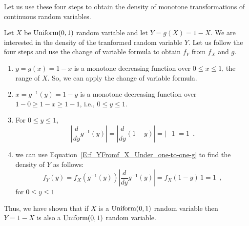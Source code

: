 Let us use these four steps to obtain the density of monotone transformations of continuous random variables.

\begin{example}
Let $X$ be $\mbox{{\rm Uniform}}(0,1)$ random variable and let $Y=g(X)=1-X$.  
We are interested in the density of the tranformed random variable $Y$. Let us follow the four steps and use the change of variable formula to obtain $f_Y$ from $f_X$ and $g$.
\begin{enumerate}
\item $y=g(x)=1-x$ is a monotone decreasing function over $0 \leq x \leq 1$, the range of $X$.  
So, we can apply the change of variable formula. 
\item $x=g^{-1}(y)=1-y$ is a monotone decreasing function over $1-0 \geq 1-x \geq 1-1$, i.e., $0 \leq y \leq 1$.  
\item For $0 \leq y \leq 1$,
\[
 \left\vert \frac{d}{dy} g^{-1}(y) \right\vert 
= \left\vert \frac{d}{dy} \left( 1-y \right) \right\vert 
= \left\vert -1 \right\vert = 1 \enspace .
\]
\item we can use Equation~\eqref{E:f_YFromf_X_Under_one-to-one-g} to find the density of $Y$ as follows:
\[
f_Y(y) = f_X \left( g^{-1}(y) \right) \left\vert \frac{d}{dy} g^{-1}(y) \right\vert 
= f_X \left( 1-y \right)  \, 1
= 1 \enspace ,
\]
for $0 \leq y \leq 1$
\end{enumerate}
Thus, we have shown that if $X$ is a $\mbox{{\rm Uniform}}(0,1)$ random variable then $Y=1-X$ is also a $\mbox{{\rm Uniform}}(0,1)$ random variable.
\end{example}

